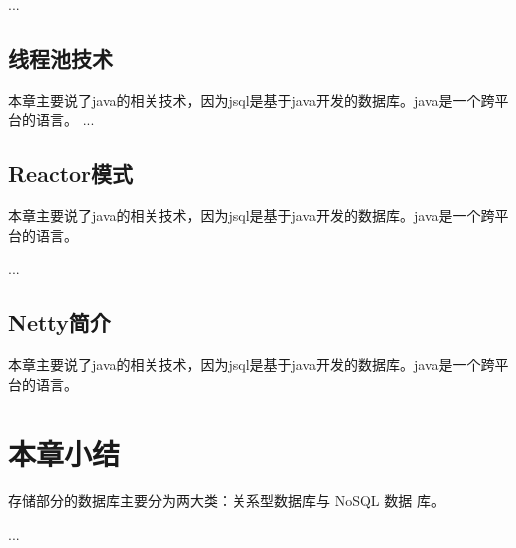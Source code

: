 ...
\subsection*{线程池技术}
本章主要说了java的相关技术，因为jsql是基于java开发的数据库。java是一个跨平台的语言。
...
\subsection*{Reactor模式}
本章主要说了java的相关技术，因为jsql是基于java开发的数据库。java是一个跨平台的语言。

...
\subsection*{Netty简介}
本章主要说了java的相关技术，因为jsql是基于java开发的数据库。java是一个跨平台的语言。

\section{本章小结}
存储部分的数据库主要分为两大类：关系型数据库与 NoSQL 数据
库。

...
